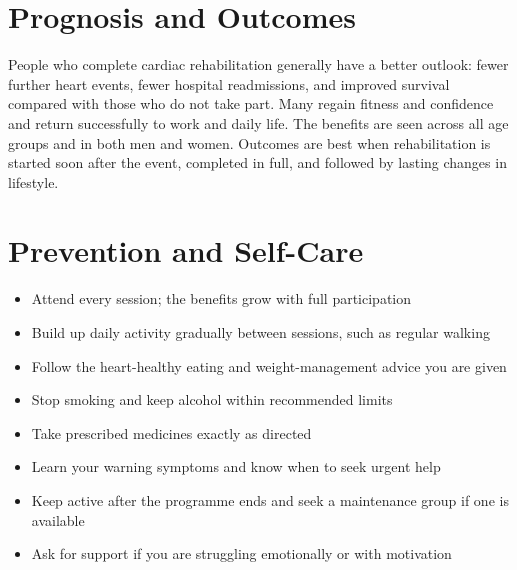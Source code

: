 \section*{Prognosis and Outcomes}
People who complete cardiac rehabilitation generally have a better outlook: fewer further heart events, fewer hospital readmissions, and improved survival compared with those who do not take part. Many regain fitness and confidence and return successfully to work and daily life. The benefits are seen across all age groups and in both men and women. Outcomes are best when rehabilitation is started soon after the event, completed in full, and followed by lasting changes in lifestyle.

\section*{Prevention and Self-Care}
\begin{itemize}
    \item Attend every session; the benefits grow with full participation
    \item Build up daily activity gradually between sessions, such as regular walking
    \item Follow the heart-healthy eating and weight-management advice you are given
    \item Stop smoking and keep alcohol within recommended limits
    \item Take prescribed medicines exactly as directed
    \item Learn your warning symptoms and know when to seek urgent help
    \item Keep active after the programme ends and seek a maintenance group if one is available
    \item Ask for support if you are struggling emotionally or with motivation
\end{itemize}

